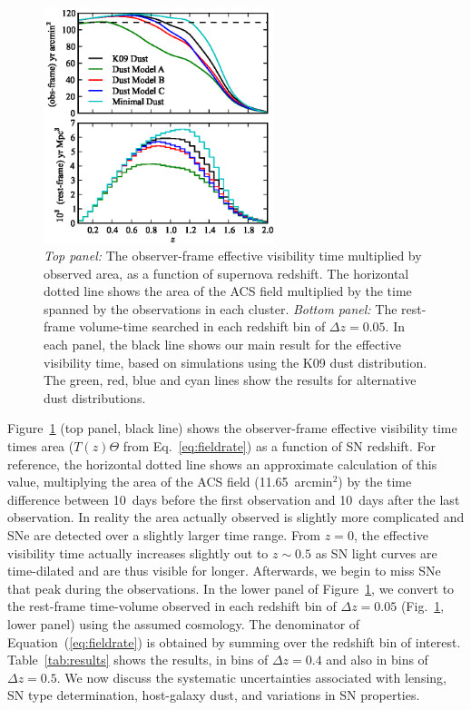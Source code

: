 

\begin{figure}
\includegraphics[width=0.6\textwidth]{figures/fieldrate/ctarea1.eps}
\caption[Effective visibility time as a function of redshift]{\emph{Top panel:} 
The observer-frame effective visibility time multiplied by observed
area, as a function of supernova redshift. The horizontal dotted line
shows the area of the ACS field multiplied by the time spanned by the
observations in each cluster.  \emph{Bottom panel:} The rest-frame
volume-time searched in each redshift bin of $\Delta z = 0.05$. In
each panel, the black line shows our main result for the effective
visibility time, based on simulations using the K09 dust
distribution. The green, red, blue and cyan lines show the results for
alternative dust distributions.\label{fig:ctarea1}}
\end{figure}

Figure~\ref{fig:ctarea1} (top panel, black line) shows the
observer-frame effective visibility time times area ($T(z) \Theta$
from Eq.~\ref{eq:fieldrate}) as a function of SN redshift. For
reference, the horizontal dotted line shows an approximate calculation
of this value, multiplying the area of the ACS field
(11.65~arcmin$^2$) by the time difference between 10~days before the
first observation and 10~days after the last observation. In reality
the area actually observed is slightly more complicated and SNe are
detected over a slightly larger time range. From $z=0$, the effective
visibility time actually increases slightly out to $z \sim 0.5$ as SN
light curves are time-dilated and are thus visible for
longer. Afterwards, we begin to miss SNe that peak during the
observations. In the lower panel of Figure~\ref{fig:ctarea1}, we convert
to the rest-frame time-volume observed in each redshift bin of $\Delta
z = 0.05$ (Fig.~\ref{fig:ctarea1}, lower panel) using the assumed
cosmology.  The denominator of Equation~(\ref{eq:fieldrate}) is
obtained by summing over the redshift bin of
interest. Table~\ref{tab:results} shows the results, in bins of
$\Delta z = 0.4$ and also in bins of $\Delta z = 0.5$. We now discuss
the systematic uncertainties
associated with lensing, SN type determination, host-galaxy dust, and
variations in SN properties.


